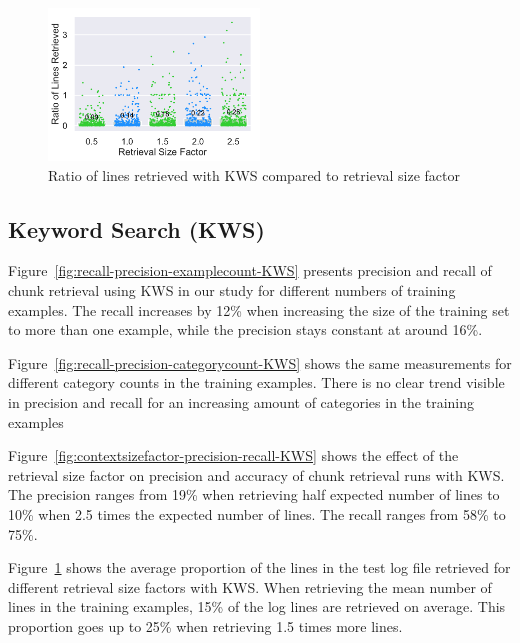 \documentclass[\myrootdir/main.tex]{subfiles}
\begin{document}
\begin{figure}[htbp]
		\centering
		\includegraphics[width=0.5\textwidth, clip]{img/big-study/retrievalsizefactor-retrievalratio-KWS.pdf}
		\caption{Ratio of lines retrieved with KWS compared to retrieval size factor}
		\label{fig:retrievalsizefactor-retrievalratio-KWS}
\end{figure}

\subsection{Keyword Search (KWS)}
Figure~\ref{fig:recall-precision-examplecount-KWS} presents precision and recall of chunk retrieval using KWS in our study for different numbers of training examples.
The recall increases by 12\% when increasing the size of the training set to more than one example, while the precision stays constant at around 16\%.

Figure~\ref{fig:recall-precision-categorycount-KWS} shows the same measurements for different category counts in the training examples.
There is no clear trend visible in precision and recall for an increasing amount of categories in the training examples

Figure~\ref{fig:contextsizefactor-precision-recall-KWS} shows the effect of the retrieval size factor on precision and accuracy of chunk retrieval runs with KWS\@.
The precision ranges from 19\% when retrieving half expected number of lines to 10\% when 2.5 times the expected number of lines.
The recall ranges from 58\% to 75\%.

Figure~\ref{fig:retrievalsizefactor-retrievalratio-KWS} shows the average proportion of the lines in the test log file retrieved for different retrieval size factors with KWS\@.
When retrieving the mean number of lines in the training examples, 15\% of the log lines are retrieved on average.
This proportion goes up to 25\% when retrieving 1.5 times more lines.
\end{document}
